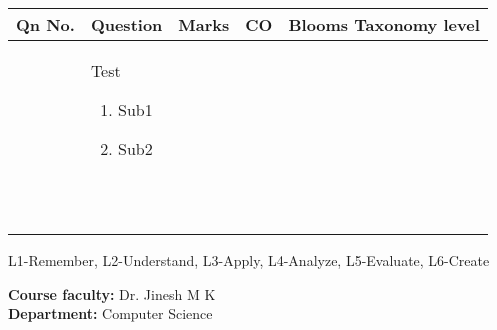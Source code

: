 \documentclass[12pt,a4paper]{article}
\newcounter{magicrownumbers}
\newcommand\rownumber{\stepcounter{magicrownumbers}\arabic{magicrownumbers}}
\begin{document}
\begin{longtable}{|p{}|p{}|p{}|p{}|p{}|}

\hline
\textbf{Qn No.}&\textbf{Question} &	\textbf{Marks}&\textbf{CO} &	\textbf{Blooms Taxonomy level} 
\\ \hline



\rownumber     &Test
\begin{enumerate}[label=(\alph*)]
    \item Sub1
    \item Sub2
\end{enumerate}

&&&\\ \hline
\rownumber&&&&\\ \hline
\rownumber&&&&\\ \hline
\rownumber&&&&\\ \hline
\rownumber&&&&\\ \hline
\rownumber&&&&\\ \hline
\rownumber&&&&\\ \hline
\rownumber&&&&\\ \hline
\rownumber&&&&\\ \hline
\rownumber&&&&\\ \hline

\end{longtable}
L1-Remember, L2-Understand, L3-Apply, L4-Analyze, L5-Evaluate, L6-Create
\vspace{1em}


\noindent\textbf{Course faculty:} Dr. Jinesh M K \\
\textbf{Department:} Computer Science 
\end{document}
